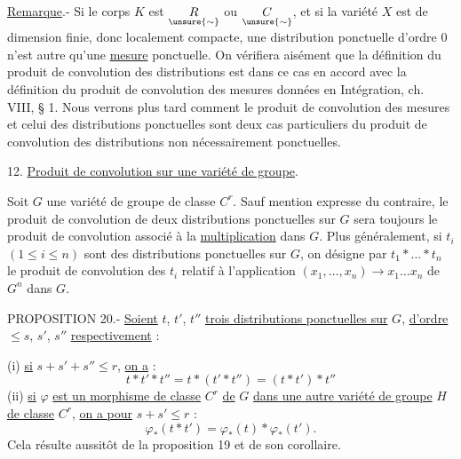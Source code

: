 
\uline{Remarque}.- Si le corps $K$ est $\underset{\unsure{\sim}}{R}$ ou $\underset{\unsure{\sim}}{C}$, et si la variété $X$ est de dimension finie, donc localement compacte, une distribution ponctuelle d'ordre $0$ n'est autre qu'une \uline{mesure} ponctuelle. On vérifiera aisément que la définition du produit de convolution des distributions est dans ce cas en accord avec la définition du produit de convolution des mesures données en Intégration, ch. VIII, § 1. Nous verrons plus tard comment le produit de convolution des mesures et celui des distributions ponctuelles sont deux cas particuliers du produit de convolution des distributions non nécessairement ponctuelles.

12. \uline{Produit de convolution sur une variété de groupe}.

Soit $G$ une variété de groupe de classe $C^r$. Sauf mention expresse du contraire, le produit de convolution de deux distributions ponctuelles sur $G$ sera toujours le produit de convolution associé à la \uline{multiplication} dans $G$. Plus généralement, si $t_i$ $(1\leq i\leq n)$ sont des distributions ponctuelles sur $G$, on désigne par $t_1*\ldots*t_n$ le produit de convolution des $t_i$ relatif à l'application $(x_1,\ldots,x_n)\longrightarrow x_1\ldots x_n$ de $G^n$ dans $G$.

PROPOSITION 20.- \uline{Soient} $t$, $t'$, $t''$ \uline{trois distributions ponctuelles sur} $G$, \uline{d'ordre} $\leq s$, $s'$, $s''$ \uline{respectivement} :

(i) \uline{si} $s+s'+s''\leq r$, \uline{on a} :
\[
t*t'*t''=t*(t'*t'')=(t*t')*t''
\]
(ii) \uline{si} $\varphi$ \uline{est un morphisme de classe} $C^r$ \uline{de} $G$ \uline{dans une autre variété de groupe} $H$ \uline{de classe} $C^r$, \uline{on a pour} $s+s'\leq r$ :
\[
\varphi_*(t*t')=\varphi_*(t)*\varphi_*(t').
\]
Cela résulte aussitôt de la proposition 19 et de son corollaire.
